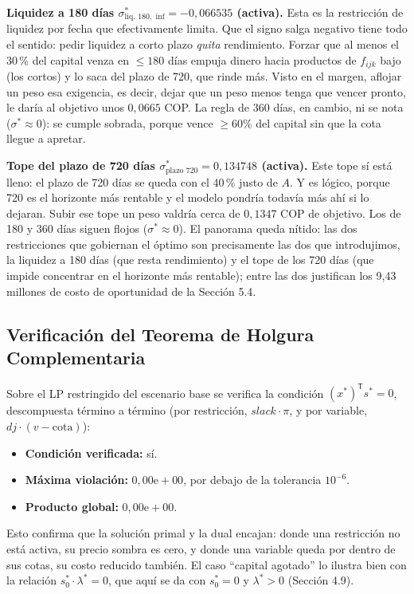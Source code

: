 \documentclass[11pt,a4paper]{article}
\newcommand{\T}{\mathsf{T}}
\begin{document}
\textbf{Liquidez a 180 días $\sigma^*_{\text{liq. }180,\text{ inf}} = -0{,}066535$
(activa).} Esta es la restricción de liquidez por fecha que efectivamente
limita. Que el signo salga negativo tiene todo el sentido: pedir liquidez a corto plazo
\emph{quita} rendimiento. Forzar que al menos el 30\,\% del capital venza en $\le 180$ días
empuja dinero hacia productos de $f_{ijk}$ bajo (los cortos) y lo saca del plazo de 720, que
rinde más. Visto en el margen, aflojar un peso esa exigencia, es decir, dejar que un peso menos
tenga que vencer pronto, le daría al objetivo unos $0{,}0665$ COP. La regla de 360 días, en
cambio, ni se nota ($\sigma^* \approx 0$): se cumple sobrada, porque vence $\ge 60\%$ del
capital sin que la cota llegue a apretar.

\textbf{Tope del plazo de 720 días $\sigma^*_{\text{plazo }720} = 0{,}134748$ (activa).} Este
tope sí está lleno: el plazo de 720 días se queda con el 40\,\% justo de $A$. Y es lógico, porque
720 es el horizonte más rentable y el modelo pondría todavía más ahí si lo dejaran. Subir ese
tope un peso valdría cerca de $0{,}1347$ COP de objetivo. Los de 180 y 360 días siguen flojos
($\sigma^* \approx 0$). El panorama queda nítido: las dos restricciones que gobiernan el óptimo
son precisamente las dos que introdujimos, la liquidez a 180 días (que resta
rendimiento) y el tope de los 720 días (que impide concentrar en el horizonte más rentable);
entre las dos justifican los 9,43 millones de costo de oportunidad de la Sección 5.4.

\subsection{Verificación del Teorema de Holgura Complementaria}

Sobre el LP restringido del escenario base se verifica la condición
$(x^*)^{\T} s^* = 0$, descompuesta término a término (por restricción,
$slack \cdot \pi$, y por variable, $dj \cdot (v - \text{cota})$):

\begin{itemize}
  \item \textbf{Condición verificada:} sí.
  \item \textbf{Máxima violación:} $0{,}00\mathrm{e}{+}00$, por debajo de la tolerancia
  $10^{-6}$.
  \item \textbf{Producto global:} $0{,}00\mathrm{e}{+}00$.
\end{itemize}

Esto confirma que la solución primal y la dual encajan: donde una restricción no está activa,
su precio sombra es cero, y donde una variable queda por dentro de sus cotas, su costo reducido
también. El caso ``capital agotado'' lo ilustra bien con la relación $s_0^* \cdot \lambda^* = 0$,
que aquí se da con $s_0^* = 0$ y $\lambda^* > 0$ (Sección 4.9).
\end{document}
